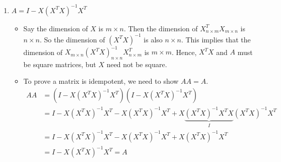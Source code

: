 \begin{enumerate}
\begin{enumerate}
\item[(b)] \(
A C=\left[\begin{array}{cc}
0 & 4 \\
-1 & 3
\end{array}\right]_{2 \times 2}\left[\begin{array}{lll}
1 & 0 & 9 \\
6 & 1 & 1
\end{array}\right]_{2 \times 3}=\left[\begin{array}{ccc}
24 & 4 & 4 \\
17 & 3 & -6
\end{array}\right]_{2 \times 3}
\)
\vspace{1em}
\(
C^T A^T=\left[\begin{array}{ll}
1 & 6 \\
0 & 1 \\
9 & 1
\end{array}\right]_{3 \times 2}\left[\begin{array}{cc}
0 & -1 \\
4 & 3
\end{array}\right]_{2 \times 2}=\left[\begin{array}{cc}
24 & 17 \\
4 & 3 \\
4 & -6
\end{array}\right]_{3 \times 2}
\) \vspace{1em}
So, $(AC)^T=C^T A^T$.
\end{enumerate}

\item[6.] \( A=I-X\left(X^T X\right)^{-1} X^T \) 

\begin{itemize}

\item[(a.)] Say the dimension of $X$ is \( m \times n \). Then the dimension of \( X_{n \times m}^T X_{m \times n} \) is \( n \times n \). So the dimension of \( \left(X^T X\right)^{-1} \) is also  \( n \times n \).  This implies that the dimension of \( X_{m \times n}\left(X^T X\right)_{n \times n}^{-1} X_{n \times m}^T \) is \( m \times m \). Hence, \( X^T X \) and $A$ must be square matrices, but $X$ need not be square.

\item[(b.)] To prove a matrix is idempotent, we need to show $AA=A$.
\[
\begin{aligned}
A A &= (I-X\left(X^T X\right)^{-1} X^T)(I-X\left(X^T X\right)^{-1} X^T) \\
& = I-X\left(X^T X\right)^{-1} X^T-X\left(X^T X\right)^{-1} X^T+X\underbrace{\left(X^T X\right)^{-1} X^T X}_{I}\left(X^T X\right)^{-1} X^T \\
&= I-X\left(X^T X\right)^{-1} X^T-X\left(X^T X\right)^{-1} X^T+X\left(X^T X\right)^{-1} X^T \\ 
&=I-X\left(X^T X\right)^{-1} X^T = A
\end{aligned}
\]
\end{itemize}
\end{enumerate}

